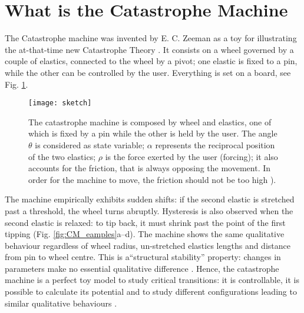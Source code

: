 \tocless\section{What is the Catastrophe Machine}

The Catastrophe machine was invented by E. C. Zeeman as a toy for illustrating the at-that-time new Catastrophe Theory \citep{poston1973zeeman,zeeman1979catastrophe}. It consists on a wheel governed by a couple of elastics, connected to the wheel by a pivot; one elastic is fixed to a pin, while the other can be controlled by the user. Everything is set on a board, see Fig. \ref{0a}.


\begin{figure}[h]
	\centering
	\texttt{[image: sketch]}
	\caption{\small The catastrophe machine is composed by wheel and elastics, one of which is fixed by a pin while the other is held by the user. The angle $\theta$ is considered as state variable; $\alpha$ represents the reciprocal position of the two elastics; $\rho$ is the force exerted by the user (forcing); it also accounts for the friction, that is always opposing the movement. In order for the machine to move, the friction should not be too high \citep{poston1979catastrophe}).}
	\label{0a}
\end{figure}


The machine empirically exhibits sudden shifts: if the second elastic is stretched past a threshold, the wheel turns abruptly. Hysteresis is also observed when the second elastic is relaxed: to tip back, it must shrink past the point of the first tipping (Fig. \ref{fig:CM_eamples}a--d). The machine shows the same qualitative behaviour regardless of wheel radius, un-stretched elastics lengths and distance from pin to wheel centre. This is a``structural stability'' property: changes in parameters make no essential qualitative difference \citep{poston1979catastrophe}. Hence, the catastrophe machine is a perfect toy model to study critical transitions: it is controllable, it is possible to calculate its potential and to study different configurations leading to similar qualitative behaviours \citep{Thom2554}. \\

